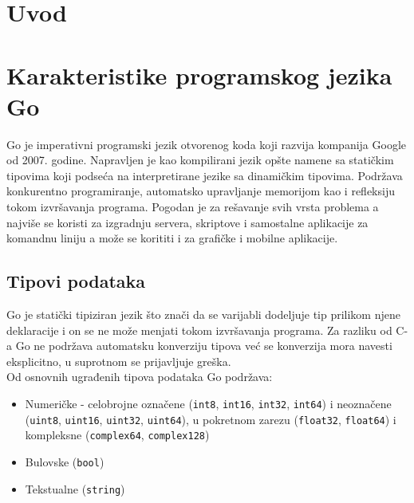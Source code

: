 \documentclass[12pt,oneside]{memoir}
\begin{document}
\frontmatter
\naslovna
\komisija
{}
\apstrakt
\tableofcontents*

\mainmatter

\chapter{Uvod}


\chapter{Karakteristike programskog jezika Go}

Go je imperativni programski jezik otvorenog koda koji razvija kompanija Google od 2007. godine. Napravljen je kao kompilirani jezik opšte namene sa statičkim tipovima koji podseća na interpretirane jezike sa dinamičkim tipovima. Podržava konkurentno programiranje, automatsko upravljanje memorijom kao i refleksiju tokom izvršavanja programa. Pogodan je za rešavanje svih vrsta problema a najviše se koristi za izgradnju servera, skriptove i samostalne aplikacije za komandnu liniju a može se korititi i za grafičke i mobilne aplikacije.

\section{Tipovi podataka}

Go je statički tipiziran jezik što znači da se varijabli dodeljuje tip prilikom njene deklaracije i on se ne može menjati tokom izvršavanja programa.  Za razliku od C-a Go ne podržava automatsku konverziju tipova već se konverzija mora navesti eksplicitno, u suprotnom se prijavljuje greška.\\

Od osnovnih ugrađenih tipova podataka Go podržava:
\begin{itemize}

\item Numeričke -  celobrojne označene (\texttt{int8}, \texttt{int16}, \texttt{int32}, \texttt{int64})
 i neoznačene  (\texttt{uint8}, \texttt{uint16}, \texttt{uint32}, \texttt{uint64}), u pokretnom zarezu (\texttt{float32}, \texttt{float64}) i kompleksne (\texttt{complex64}, \texttt{complex128})

\item Bulovske  (\texttt{bool})

\item Tekstualne (\texttt{string})

\end{itemize}
\end{document}
